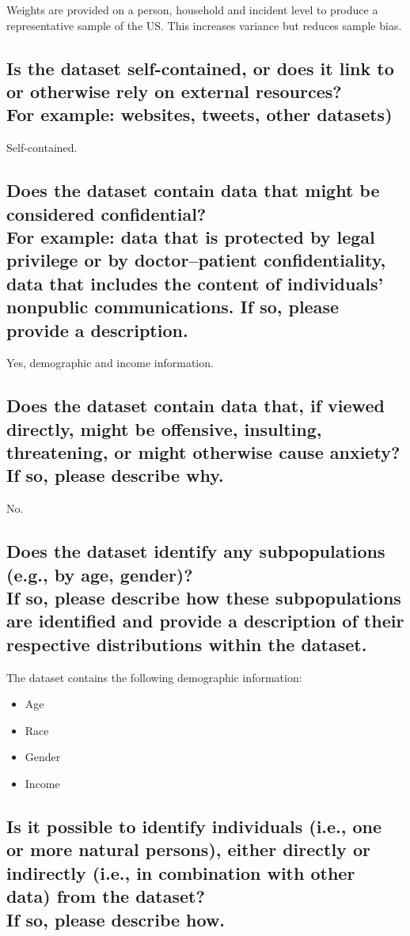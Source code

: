 \documentclass[letterpaper, 10 pt, conference]{ieeeconf}  %
\newcommand{\subtitle}[1]{{\\ \small \normalfont \color{purple} #1}}
\begin{document}
Weights are provided on a person, household and incident level to produce a representative sample of the US. This increases variance but reduces sample bias.

\subsection{Is the dataset self-contained, or does it link to or otherwise rely on external resources? \subtitle{For example: websites, tweets, other datasets)}}

Self-contained.

\subsection{Does the dataset contain data that might be considered confidential? \subtitle{For example: data that is protected by legal privilege or by doctor–patient confidentiality, data that includes the content of individuals’ nonpublic communications. If so, please provide a description.}}

Yes, demographic and income information.

\subsection{Does the dataset contain data that, if viewed directly, might be offensive, insulting, threatening, or might otherwise cause anxiety? \subtitle{If so, please describe why.}}

No.

\subsection{Does the dataset identify any subpopulations (e.g., by age, gender)? \subtitle{If so, please describe how these subpopulations are identified and provide a description of their respective distributions within the dataset.}}

The dataset contains the following demographic information:

\begin{itemize}
    \item Age
    \item Race
    \item Gender
    \item Income
\end{itemize}

\subsection{Is it possible to identify individuals (i.e., one or more natural persons), either directly or indirectly (i.e., in combination with other data) from the dataset? \subtitle{If so, please describe how.}}
\end{document}
